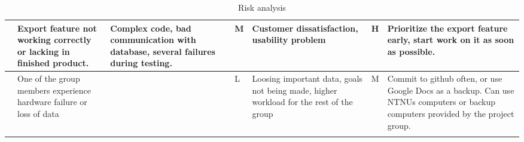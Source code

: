 \begin{landscape}
\begin{longtable}{| p{0.4cm} | p{4cm} | p{4cm} | p{2cm} | p{4cm} | p{1cm} | p{4cm} |}
	\stepcounter{riskId}
	\centering
		\arabic{riskId} &
        Export feature not working correctly or lacking in finished product. &
		Complex code, bad communication with database, several failures during testing. &
		\centering  M &
		Customer dissatisfaction, usability problem &
		\centering H &
		Prioritize the export feature early, start work on it as soon as possible. \\
	\hline

	\stepcounter{riskId}
	\centering
		\arabic{riskId} &
        One of the group members experience hardware failure or loss of data &
		& \centering L &
		Loosing important data, goals not being made, higher workload for the rest of the group &
		\centering M &
		Commit to github often, or use Google Docs as a backup. Can use NTNUs computers or backup computers provided by the project group. \\
	\hline
\caption{Risk analysis}
\end{longtable}

\end{landscape}
